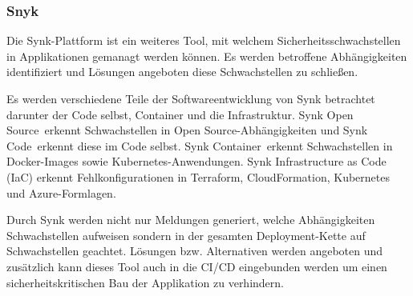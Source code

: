 \subsubsection{Snyk} \label{sec:Snyk}
    Die Synk-Plattform ist ein weiteres Tool, mit welchem Sicherheitsschwachstellen in Applikationen gemanagt werden können.
    Es werden betroffene Abhängigkeiten identifiziert und Lösungen angeboten diese Schwachstellen zu schließen.\textsuperscript{\cite{link:SYNK}}

    Es werden verschiedene Teile der Softwareentwicklung von Synk betrachtet darunter der Code selbst, Container und die Infrastruktur.
    \glqq Synk Open Source\grqq~erkennt Schwachstellen in \glqq Open Source\grqq-Abhängigkeiten und \glqq Synk Code\grqq~erkennt diese im Code selbst.
    \glqq Synk Container\grqq~erkennt Schwachstellen in Docker-Images sowie Kubernetes\textsuperscript{\cite{link:Kubernetes}}-Anwendungen.
    \glqq Synk Infrastructure as Code (IaC)\grqq\textsuperscript{\cite{link:SynkIaC}} erkennt Fehlkonfigurationen in Terraform\textsuperscript{\cite{link:Terraform}}, CloudFormation\textsuperscript{\cite{link:CloudFormation}}, Kubernetes\textsuperscript{\cite{link:Kubernetes}} und Azure-Formlagen\textsuperscript{\cite{link:Azure}}.

    Durch Synk werden nicht nur Meldungen generiert, welche Abhängigkeiten Schwachstellen aufweisen sondern in der gesamten Deployment-Kette auf Schwachstellen geachtet.
    Lösungen bzw. Alternativen werden angeboten und zusätzlich kann dieses Tool auch in die CI/CD eingebunden werden um einen sicherheitskritischen Bau der Applikation zu verhindern.
